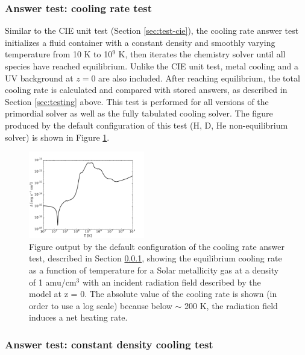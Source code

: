 \subsubsection{Answer test: cooling rate test}
\label{sec:cooling-rate-test}

Similar to the CIE unit test (Section \ref{sec:test-cie}), the cooling
rate answer test initializes a fluid container with a constant density
and smoothly varying temperature from 10 K to 10$^{9}$ K, then
iterates the chemistry solver until all species have reached
equilibrium.  Unlike the CIE unit test, metal cooling and a
\citet{2012ApJ...746..125H} UV background at $z = 0$ are also included.
After reaching equilibrium, the total cooling rate is calculated and
compared with stored answers, as described in Section
\ref{sec:testing} above.  This test is performed for all versions of
the primordial solver as well as the fully tabulated cooling solver.
The figure produced by the default configuration of this test
(H, D, He non-equilibrium solver) is shown in Figure
\ref{fig:cooling-rate-test}.

\begin{figure}
  \centering
  \includegraphics[width=0.45\textwidth]{cooling_rate.pdf}
  \caption{ Figure output by the default configuration of the cooling
    rate answer test, described in Section
    \ref{sec:cooling-rate-test}, showing the equilibrium cooling rate
    as a function of temperature for a Solar metallicity gas at a
    density of 1 amu/cm$^{3}$ with an incident radiation field
    described by the \citet{2012ApJ...746..125H} model at z = 0.  The
    absolute value of the cooling rate is shown (in order to use a
    log scale) because below $\sim$ 200 K, the radiation field
    induces a net heating rate.  } \label{fig:cooling-rate-test}
\end{figure}

\subsubsection{Answer test: constant density cooling test}
\label{sec:uniform-cooling-test}

